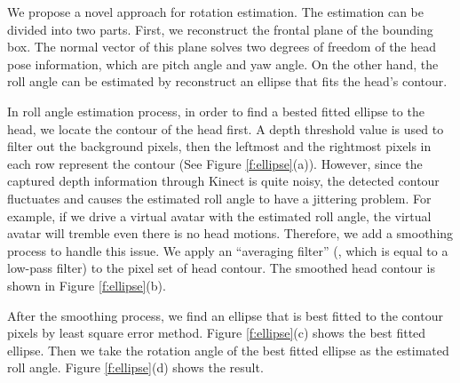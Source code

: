 We propose a novel approach for rotation estimation. The estimation can be divided into two parts. First, we reconstruct the frontal plane of the bounding box. The normal vector of this plane solves two degrees of freedom of the head pose information, which are pitch angle and yaw angle. On the other hand, the roll angle can be estimated by reconstruct an ellipse that fits the head's contour. 

In roll angle estimation process, in order to find a bested fitted ellipse to the head, we locate the contour of the head first. A depth threshold value is used to filter out the background pixels, then the leftmost and the rightmost pixels in each row represent the contour (See Figure \ref{f:ellipse}(a)). However, since the captured depth information through Kinect is quite noisy, the detected contour fluctuates and causes the estimated roll angle to have a jittering problem. For example, if we drive a virtual avatar with the estimated roll angle, the virtual avatar will tremble even there is no head motions. Therefore, we add a smoothing process to handle this issue. We apply an ``averaging filter'' (, which is equal to a low-pass filter) to the pixel set of head contour. The smoothed head contour is shown in Figure \ref{f:ellipse}(b).

After the smoothing process, we find an ellipse that is best fitted to the contour pixels by least square error method. Figure \ref{f:ellipse}(c) shows the best fitted ellipse. Then we take the rotation angle of the best fitted ellipse as the estimated roll angle. Figure \ref{f:ellipse}(d) shows the result.

